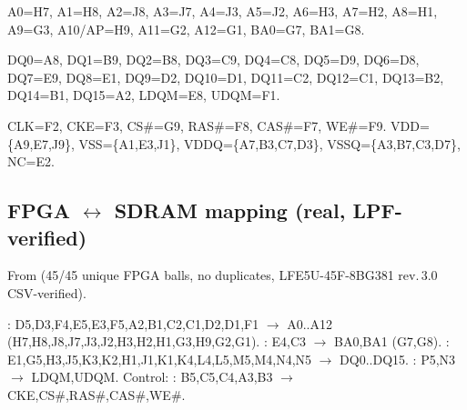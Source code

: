 \begin{fnnote}
A0=H7, A1=H8, A2=J8, A3=J7, A4=J3, A5=J2, A6=H3, A7=H2, A8=H1, A9=G3,
A10/AP=H9, A11=G2, A12=G1, BA0=G7, BA1=G8.
\end{fnnote}
\begin{fnnote}
DQ0=A8, DQ1=B9, DQ2=B8, DQ3=C9, DQ4=C8, DQ5=D9, DQ6=D8, DQ7=E9, DQ8=E1,
DQ9=D2, DQ10=D1, DQ11=C2, DQ12=C1, DQ13=B2, DQ14=B1, DQ15=A2, LDQM=E8,
UDQM=F1.
\end{fnnote}
\begin{fnnote}
CLK=F2, CKE=F3, CS\#=G9, RAS\#=F8, CAS\#=F7, WE\#=F9. VDD=\{A9,E7,J9\},
VSS=\{A1,E3,J1\}, VDDQ=\{A7,B3,C7,D3\}, VSSQ=\{A3,B7,C3,D7\}, NC=E2.
\end{fnnote}

\subsection{FPGA $\leftrightarrow$ SDRAM mapping (real, LPF-verified)}
From  (45/45 unique
FPGA balls, no duplicates, LFE5U-45F-8BG381 rev.\,3.0 CSV-verified).

\begin{fnnote}
: D5,D3,F4,E5,E3,F5,A2,B1,C2,C1,D2,D1,F1 $\to$
A0..A12 (H7,H8,J8,J7,J3,J2,H3,H2,H1,G3,H9,G2,G1). :
E4,C3 $\to$ BA0,BA1 (G7,G8). :
E1,G5,H3,J5,K3,K2,H1,J1,K1,K4,L4,L5,M5,M4,N4,N5 $\to$ DQ0..DQ15.
: P5,N3 $\to$ LDQM,UDQM. Control:
: B5,C5,C4,A3,B3 $\to$
CKE,CS\#,RAS\#,CAS\#,WE\#.
\end{fnnote}


